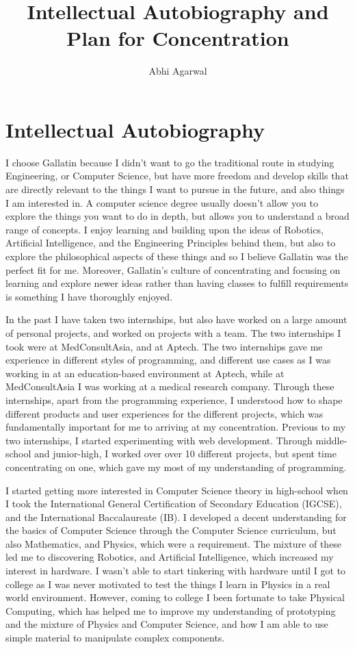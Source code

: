 \documentclass[11pt, oneside]{article}   	%
\title{Intellectual Autobiography and Plan for Concentration}
\author{Abhi Agarwal}
\date{} %
\begin{document}
\maketitle
\section{Intellectual Autobiography}

\par I choose Gallatin because I didn't want to go the traditional route in studying Engineering, or Computer Science, but have more freedom and develop skills that are directly relevant to the things I want to pursue in the future, and also things I am interested in. A computer science degree usually doesn't allow you to explore the things you want to do in depth, but allows you to understand a broad range of concepts. I enjoy learning and building upon the ideas of Robotics, Artificial Intelligence, and the Engineering Principles behind them, but also to explore the philosophical aspects of these things and so I believe Gallatin was the perfect fit for me. Moreover, Gallatin's culture of concentrating and focusing on learning and explore newer ideas rather than having classes to fulfill requirements is something I have thoroughly enjoyed.

\par In the past I have taken two internships, but also have worked on a large amount of personal projects, and worked on projects with a team. The two internships I took were at MedConsultAsia, and at Aptech. The two internships gave me experience in different styles of programming, and different use cases as I was working in at an education-based environment at Aptech, while at MedConsultAsia I was working at a medical research company. Through these internships, apart from the programming experience, I understood how to shape different products and user experiences for the different projects, which was fundamentally important for me to arriving at my concentration. Previous to my two internships, I started experimenting with web development. Through middle-school and junior-high, I worked over over 10 different projects, but spent time concentrating on one, which gave my most of my understanding of programming.

\par I started getting more interested in Computer Science theory in high-school when I took the International General Certification of Secondary Education (IGCSE), and the International Baccalaureate (IB). I developed a decent understanding for the basics of Computer Science through the Computer Science curriculum, but also Mathematics, and Physics, which were a requirement. The mixture of these led me to discovering Robotics, and Artificial Intelligence, which increased my interest in hardware. I wasn't able to start tinkering with hardware until I got to college as I was never motivated to test the things I learn in Physics in a real world environment. However, coming to college I been fortunate to take Physical Computing, which has helped me to improve my understanding of prototyping and the mixture of Physics and Computer Science, and how I am able to use simple material to manipulate complex components.
\end{document}
